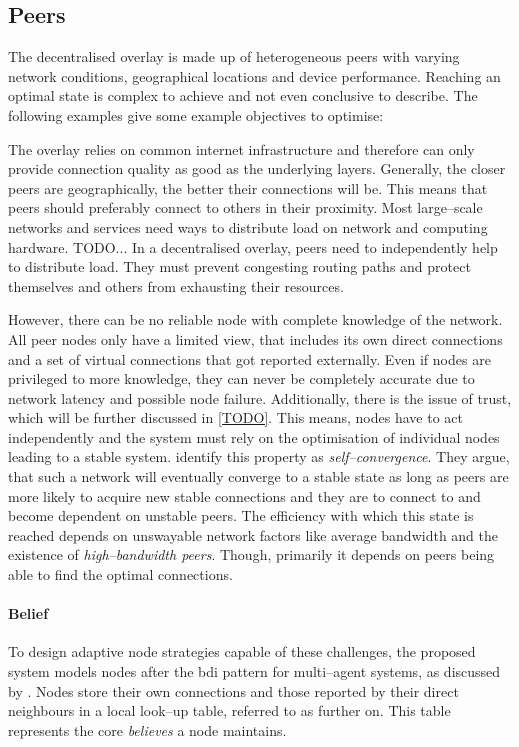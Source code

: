 \subsection{Peers}
The decentralised overlay is made up of heterogeneous peers with varying network conditions, geographical locations and device performance. Reaching an optimal state is complex to achieve and not even conclusive to describe. The following examples give some example objectives to optimise:
\begin{itemize}
    The overlay relies on common internet infrastructure and therefore can only provide connection quality as good as the underlying layers. Generally, the closer peers are geographically, the better their connections will be. This means that peers should preferably connect to others in their proximity.
    Most large–scale networks and services need ways to distribute load on network and computing hardware. TODO... In a decentralised overlay, peers need to independently help to distribute load. They must prevent congesting routing paths and protect themselves and others from exhausting their resources.
\end{itemize}

However, there can be no reliable node with complete knowledge of the network. All peer nodes only have a limited view, that includes its own direct connections and a set of virtual connections that got reported externally. Even if nodes are privileged to more knowledge, they can never be completely accurate due to network latency and possible node failure. Additionally, there is the issue of trust, which will be further discussed in \ref{TODO}. This means, nodes have to act independently and the system must rely on the optimisation of individual nodes leading to a stable system. \citet*[V.B]{coolstreaming-design-theory} identify this property as \textit{self–convergence}. They argue, that such a network will eventually converge to a stable state as long as peers are more likely to acquire new stable connections and they are to connect to and become dependent on unstable peers. The efficiency with which this state is reached depends on unswayable network factors like average bandwidth and the existence of \textit{high–bandwidth peers}. Though, primarily it depends on peers being able to find the optimal connections.

\paragraph{Belief}\label{par:bdi-belief}
To design adaptive node strategies capable of these challenges, the proposed system models nodes after the \gls{bdi} pattern for multi–agent systems, as discussed by \citet[\S3]{bdi-agents-theory-practice}.
Nodes store their own connections and those reported by their direct neighbours in a local look–up table, referred to as \peerTable further on. This table represents the core \textit{believes} a node maintains.

